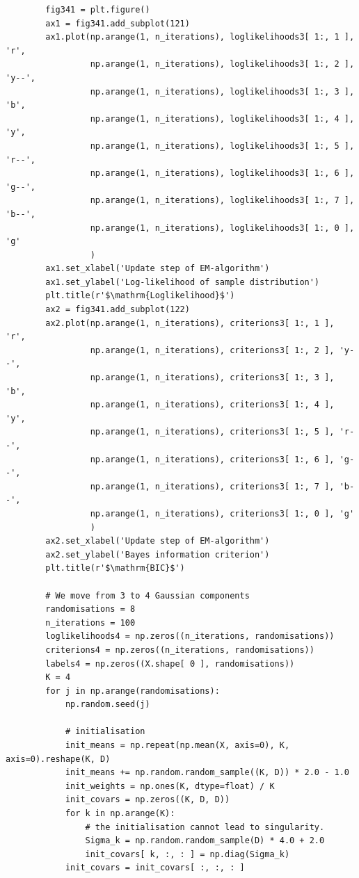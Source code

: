 \begin{verbatim}
        fig341 = plt.figure()
        ax1 = fig341.add_subplot(121)
        ax1.plot(np.arange(1, n_iterations), loglikelihoods3[ 1:, 1 ], 'r',
                 np.arange(1, n_iterations), loglikelihoods3[ 1:, 2 ], 'y--',
                 np.arange(1, n_iterations), loglikelihoods3[ 1:, 3 ], 'b',
                 np.arange(1, n_iterations), loglikelihoods3[ 1:, 4 ], 'y',
                 np.arange(1, n_iterations), loglikelihoods3[ 1:, 5 ], 'r--',
                 np.arange(1, n_iterations), loglikelihoods3[ 1:, 6 ], 'g--',
                 np.arange(1, n_iterations), loglikelihoods3[ 1:, 7 ], 'b--',
                 np.arange(1, n_iterations), loglikelihoods3[ 1:, 0 ], 'g'
                 )
        ax1.set_xlabel('Update step of EM-algorithm')
        ax1.set_ylabel('Log-likelihood of sample distribution')
        plt.title(r'$\mathrm{Loglikelihood}$')
        ax2 = fig341.add_subplot(122)
        ax2.plot(np.arange(1, n_iterations), criterions3[ 1:, 1 ], 'r',
                 np.arange(1, n_iterations), criterions3[ 1:, 2 ], 'y--',
                 np.arange(1, n_iterations), criterions3[ 1:, 3 ], 'b',
                 np.arange(1, n_iterations), criterions3[ 1:, 4 ], 'y',
                 np.arange(1, n_iterations), criterions3[ 1:, 5 ], 'r--',
                 np.arange(1, n_iterations), criterions3[ 1:, 6 ], 'g--',
                 np.arange(1, n_iterations), criterions3[ 1:, 7 ], 'b--',
                 np.arange(1, n_iterations), criterions3[ 1:, 0 ], 'g'
                 )
        ax2.set_xlabel('Update step of EM-algorithm')
        ax2.set_ylabel('Bayes information criterion')
        plt.title(r'$\mathrm{BIC}$')

        # We move from 3 to 4 Gaussian components
        randomisations = 8
        n_iterations = 100
        loglikelihoods4 = np.zeros((n_iterations, randomisations))
        criterions4 = np.zeros((n_iterations, randomisations))
        labels4 = np.zeros((X.shape[ 0 ], randomisations))
        K = 4
        for j in np.arange(randomisations):
            np.random.seed(j)

            # initialisation
            init_means = np.repeat(np.mean(X, axis=0), K, axis=0).reshape(K, D)
            init_means += np.random.random_sample((K, D)) * 2.0 - 1.0
            init_weights = np.ones(K, dtype=float) / K
            init_covars = np.zeros((K, D, D))
            for k in np.arange(K):
                # the initialisation cannot lead to singularity.
                Sigma_k = np.random.random_sample(D) * 4.0 + 2.0
                init_covars[ k, :, : ] = np.diag(Sigma_k)
            init_covars = init_covars[ :, :, : ]


\end{verbatim}
